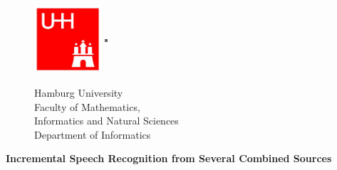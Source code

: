 %
%

\begin{titlepage}

  \setcounter{page}{-1}

	\begin{figure}[h]
		\begin{minipage}[b]{25mm}
			\includegraphics[width=25mm,clip]{images/logo_uhh}
		\end{minipage}
		\begin{minipage}[b]{2mm}
			\includegraphics[width=1mm,height=24mm]{images/greypixel}
		\end{minipage}
		\begin{minipage}[b]{12 cm}
			{\sffamily
				{\Large Hamburg University } \\
				Faculty of Mathematics,\\
				Informatics and Natural Sciences \\
				Department of Informatics \\
			}
		\end{minipage}
	\end{figure}

	\vfill
	
	\begin{center}
		\vspace{14mm}
		\noindent \textbf{\Large
		  Incremental Speech Recognition from Several Combined Sources \\		  
		}
		\vspace{10mm}
		
		\noindent {\large
		
		}
	\end{center}
	
	\vfill
	

\end{titlepage}
